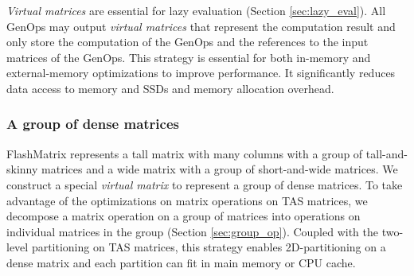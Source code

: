 \textit{Virtual matrices} are essential for lazy evaluation (Section
\ref{sec:lazy_eval}). All GenOps may output \textit{virtual matrices} that
represent the computation result and only store the computation of the GenOps
and the references to the input matrices of the GenOps. This strategy is
essential for both in-memory and external-memory optimizations to improve
performance. It significantly reduces data access to memory and SSDs and
memory allocation overhead.




\subsubsection{A group of dense matrices} \label{sec:mat_group}
FlashMatrix represents a tall matrix with many columns with a group of
tall-and-skinny matrices and a wide matrix with a group of short-and-wide
matrices. We construct a special \textit{virtual matrix} to represent
a group of dense matrices. To take advantage of the optimizations on matrix
operations on TAS matrices, we decompose a matrix operation on a group of
matrices into operations on individual matrices in the group (Section
\ref{sec:group_op}).
Coupled with the two-level partitioning on TAS matrices, this strategy enables
2D-partitioning on a dense matrix and each partition can fit in main memory
or CPU cache.

